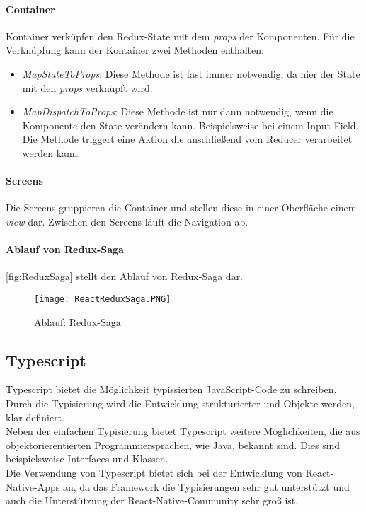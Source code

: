 \paragraph{Container}
Kontainer verküpfen den Redux-State mit dem \textit{props} der Komponenten. Für die Verknüpfung
kann der Kontainer zwei Methoden enthalten:
\begin{itemize}
    \item \textit{MapStateToProps}: Diese Methode ist fast immer notwendig, da hier der State mit den \textit{props} verknüpft wird.
    \item \textit{MapDispatchToProps}: Diese Methode ist nur dann notwendig, wenn die Komponente den State verändern kann. Beispielsweise bei einem Input-Field.
    Die Methode triggert eine Aktion die anschließend vom Reducer verarbeitet werden kann.
\end{itemize}

\paragraph{Screens}
Die Screens gruppieren die Container und stellen diese in einer Oberfläche einem \textit{view} dar.
Zwischen den Screens läuft die Navigation ab.

\paragraph{Ablauf von Redux-Saga}
\autoref{fig:ReduxSaga} stellt den Ablauf von Redux-Saga dar.
\begin{figure}[h]
    \centering
    \texttt{[image: ReactReduxSaga.PNG]}
    \caption{Ablauf: Redux-Saga}
    \label{fig:ReduxSaga}
\end{figure}

\subsection{Typescript}
Typescript bietet die Möglichkeit typissierten JavaScript-Code zu schreiben.
Durch die Typisierung wird die Entwicklung strukturierter und Objekte werden,
klar definiert. \\
Neben der einfachen Typisierung bietet Typescript weitere Möglichkeiten, die aus
objektorierentierten Programmiersprachen, wie Java, bekannt sind. Dies sind beispielsweise
Interfaces und Klassen. \\
Die Verwendung von Typescript bietet sich bei der Entwicklung von React-Native-Apps an,
da das Framework die Typisierungen sehr gut unterstützt und auch die Unterstützung der React-Native-Community sehr groß ist. \cite{TypescriptReasons:online}

